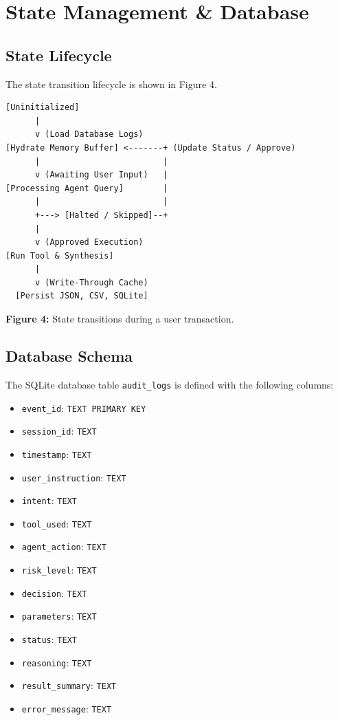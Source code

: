 \documentclass{article}
\begin{document}
\section{State Management \& Database}

\subsection{State Lifecycle}
The state transition lifecycle is shown in Figure 4.

\begin{verbatim}
[Uninitialized]
      |
      v (Load Database Logs)
[Hydrate Memory Buffer] <-------+ (Update Status / Approve)
      |                         |
      v (Awaiting User Input)   |
[Processing Agent Query]        |
      |                         |
      +---> [Halted / Skipped]--+
      |
      v (Approved Execution)
[Run Tool & Synthesis]
      |
      v (Write-Through Cache)
  [Persist JSON, CSV, SQLite]
\end{verbatim}
\begin{center}
\small \textbf{Figure 4:} State transitions during a user transaction.
\end{center}

\subsection{Database Schema}
The SQLite database table \texttt{audit\_logs} is defined with the following columns:
\begin{itemize}
    \item \texttt{event\_id}: \texttt{TEXT PRIMARY KEY}
    \item \texttt{session\_id}: \texttt{TEXT}
    \item \texttt{timestamp}: \texttt{TEXT}
    \item \texttt{user\_instruction}: \texttt{TEXT}
    \item \texttt{intent}: \texttt{TEXT}
    \item \texttt{tool\_used}: \texttt{TEXT}
    \item \texttt{agent\_action}: \texttt{TEXT}
    \item \texttt{risk\_level}: \texttt{TEXT}
    \item \texttt{decision}: \texttt{TEXT}
    \item \texttt{parameters}: \texttt{TEXT}
    \item \texttt{status}: \texttt{TEXT}
    \item \texttt{reasoning}: \texttt{TEXT}
    \item \texttt{result\_summary}: \texttt{TEXT}
    \item \texttt{error\_message}: \texttt{TEXT}
\end{itemize}
\end{document}

